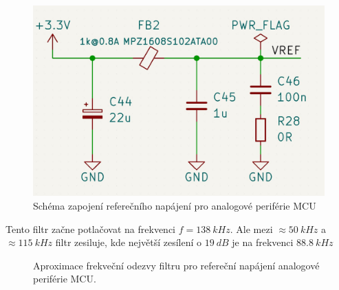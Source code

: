 \begin{figure}[H]
    \centering
    \includegraphics[width=0.9\linewidth]{pictures/stm_analog_reference.jpg}
    \caption{Schéma zapojení referečního napájení pro analogové periférie MCU}
    \label{fig:stm32_vref}
\end{figure}

Tento filtr začne potlačovat na frekvenci $f = 138 \ kHz$. Ale mezi $\approx 50 \ kHz$ a $ \approx 115 \ kHz$ filtr zesiluje, kde největší zesílení o $19 \ dB$ je na frekvenci $88.8 \ kHz$

\begin{figure}[H]
    \caption{Aproximace frekveční odezvy filtru pro refereční napájení analogové periférie MCU.}
    \label{fig:stm32_vref_response}
\end{figure}


